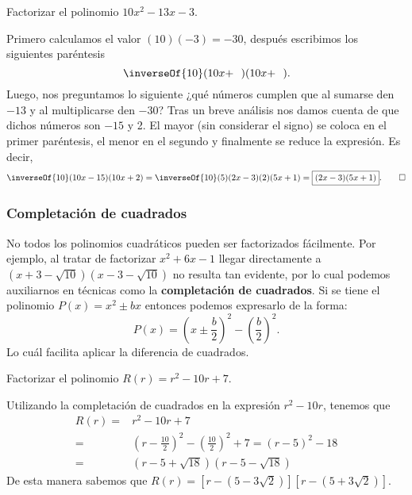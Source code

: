 \begin{example}
    Factorizar el polinomio $10x^2 - 13x - 3$.
\end{example}
\begin{solution}
    Primero calculamos el valor $(10)(-3) = -30$, después escribimos los siguientes paréntesis
    \[
        \inverseOf{10} (10x + \ \ )(10x + \ \ ).
    \]
    Luego, nos preguntamos lo siguiente ¿qué números cumplen que al sumarse den $-13$ y al multiplicarse den $-30$?
    Tras un breve análisis nos damos cuenta de que dichos números son $-15$ y 2.
    El mayor (sin considerar el signo) se coloca en el primer paréntesis, el menor en el segundo y finalmente se reduce la expresión.
    Es decir,
    \[
        \inverseOf{10} (10x - 15)(10x + 2) = \inverseOf{10} (5)(2x - 3)(2)(5x + 1) = \boxed{(2x - 3)(5x + 1)}. \qedhere
    \]
\end{solution}



\subsubsection{Completación de cuadrados}

No todos los polinomios cuadráticos pueden ser factorizados fácilmente.
Por ejemplo, al tratar de factorizar $x^2 + 6x - 1$ llegar directamente a $\left(x + 3 - \sqrt {10}\right)\left(x - 3-\sqrt {10}\right)$ no resulta tan evidente, por lo cual podemos auxiliarnos en técnicas como la \textbf{completación de cuadrados}.
Si se tiene el polinomio $P(x) = x^2 \pm bx$ entonces podemos expresarlo de la forma:
\[
    P(x) = \left( x \pm \frac{b}{2} \right)^2 - \left( \frac{b}{2} \right)^2.
\]
Lo cuál facilita aplicar la diferencia de cuadrados.

\begin{example}
    Factorizar el polinomio $R(r) = r^2 - 10r + 7$.
\end{example}
\begin{solution}
    Utilizando la completación de cuadrados en la expresión $r^2 - 10r$, tenemos que
    \begin{align*}
        R(r) =& r^2 - 10r + 7\\
        =& \left( r - \frac{10}{2} \right)^2 - \left( \frac{10}{2} \right)^2 + 7
        = \left( r - 5 \right)^2 - 18\\
        =& \left( r - 5 + \sqrt {18} \right)\left( r - 5 - \sqrt {18} \right)
    \end{align*}
    De esta manera sabemos que $R(r) = \left[ r - \left( 5 - 3\sqrt {2} \right)\right]\left[ r - \left( 5 + 3\sqrt {2} \right)\right]$.
\end{solution}


